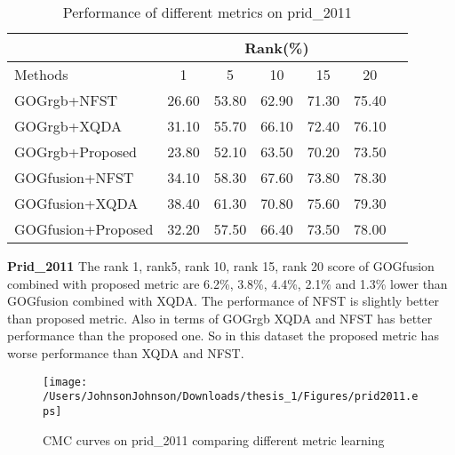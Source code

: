 \begin{table}[H]
\caption{Performance of different metrics on prid\_2011}
\centering
\begin{tabular}{|l|c|c|c|c|c|c|}
\hline
& \multicolumn{5}{|c|}{Rank(\%)} \\
\hline
Methods& 1 & 5 &10& 15&20\\
\hline
GOGrgb+NFST&26.60 &53.80& 62.90&71.30&75.40 \\ 
\hline
GOGrgb+XQDA&31.10 & 55.70& 66.10 & 72.40&76.10\\  
\hline
GOGrgb+Proposed&23.80& 52.10& 63.50&70.20&73.50\\  %
\hline
GOGfusion+NFST&34.10 &58.30& 67.60&73.80&78.30 \\  
\hline
GOGfusion+XQDA&38.40& 61.30&70.80&75.60&79.30\\
\hline
GOGfusion+Proposed&32.20&57.50&66.40&73.50&78.00\\ %

\hline

\end{tabular}\newline
\end{table}

\textbf{Prid\_2011}  The  rank 1, rank5, rank 10, rank 15, rank 20 score of GOGfusion  combined with proposed metric are 6.2\%, 3.8\%, 4.4\%, 2.1\% and 1.3\% lower than GOGfusion combined with XQDA. The performance of NFST is slightly better than proposed metric. Also in terms of GOGrgb XQDA and NFST has better performance than the proposed one. So in this dataset the proposed metric has worse performance than XQDA and NFST.

\begin{figure}[H]
\begin{raggedleft}
\texttt{[image: /Users/JohnsonJohnson/Downloads/thesis\_1/Figures/prid2011.eps]}
\vspace{-3em}
\caption{CMC curves on prid\_2011 comparing different metric learning}
\end{raggedleft}
\end{figure}

